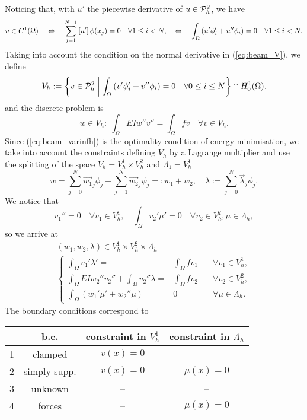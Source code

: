 Noticing that, with $u'$ the piecewise derivative of $u\in \mathcal{P}^2_h$, we have
%
\begin{equation}\label{eq:beam_C1P2}
u\in C^1(\Omega) 
\quad\Leftrightarrow\quad \sum_{j=1}^{N-1} \left[u'\right]\phi(x_j)=0 \quad\forall 1\le i< N,
\quad\Leftrightarrow\quad \int_{\Omega} \left(u'\phi'_i + u''\phi_i\right)=0 \quad\forall 1\le i< N.
\end{equation}
%
Taking into account the condition on the normal derivative in (\ref{eq:beam_V}), we define
%
\begin{equation}\label{eq:beam_Vh}
V_h := \left\{v\in \mathcal{P}^2_h\;\middle|\;\int_{\Omega} \left(v'\phi'_i + v''\phi_i\right)=0 \quad\forall 0\le i\le N\right\}\cap H^1_0(\Omega).
\end{equation}
%
and the discrete problem is
%
\begin{equation}\label{eq:beam_varinfh}
w\in V_h:\; \int_{\Omega}EIw''v'' =\int_{\Omega}fv\quad \forall v\in V_h.
\end{equation}
%
Since (\ref{eq:beam_varinfh}) is the optimality condition of energy minimisation, we take into account the constraints defining $V_h$ by a Lagrange multiplier and use the splitting of the space $V_h=V_h^1\times V_h^2$ and $\Lambda_1=V_h^1$
%
\begin{equation}\label{eq:}
w = \sum_{j=0}^N \vec{w_1}_j \phi_j +  \sum_{j=1}^N \vec{w_2}_j \psi_j =: w_1 + w_2,\quad \lambda := \sum_{j=0}^N \vec{\lambda}_j \phi_j.
\end{equation}
%
We notice that
%
\begin{equation}\label{eq:}
v_1''=0\quad\forall v_1\in V_h^1,\quad \int_{\Omega} v_2'\mu'=0\quad\forall v_2\in V_h^2, \mu\in\Lambda_h,
\end{equation}
%
so we arrive at
%
\begin{align*}
(w_1,w_2,\lambda)\in V_h^1\times V_h^2 \times \Lambda_h\\
\left\{
\begin{aligned}
\int_{\Omega}v_1'\lambda' =&\int_{\Omega}fv_1\quad& \forall v_1\in V_h^1,\\
\int_{\Omega}EIw_2''v_2'' +  \int_{\Omega} v_2''\lambda=&\int_{\Omega}fv_2\quad& \forall v_2\in V_h^2,\\
\int_{\Omega} \left(w_1'\mu' + w_2''\mu\right)=&0\quad&\forall \mu\in \Lambda_h.
\end{aligned}
\right.
\end{align*}
%
The boundary conditions correspond to
%
\begin{center}
\begin{tabular}{c|c|c|c}
&b.c.&constraint in $V_h^1$& constraint in $\Lambda_h$\\\hline
1&clamped&$v(x)=0$  & --\\
2&simply supp.&$v(x)=0$ & $\mu(x)=0$ \\
3&unknown&-- & --\\
4&forces&-- & $\mu(x)=0$
\end{tabular}
\end{center}
